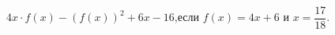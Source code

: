 \begin{ex}[type=calculate_expression]
	\begin{condition}
		\( 4x\cdot f(x)-(f(x))^2 +6x -16 \),\quad если \( f(x)=4x+6 \) и \( x=\dfrac{17}{18} \).
	\end{condition}
\end{ex}